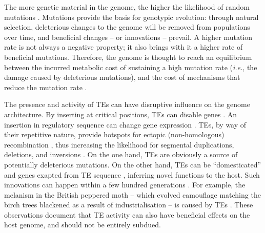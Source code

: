 The more genetic material in the genome, the higher the likelihood of
random mutations \citep{Wielgoss2011}. Mutations provide the basis for
genotypic evolution: through natural selection, deleterious changes to
the genome will be removed from populations over time, and beneficial
changes -- or innovations -- prevail.  A higher mutation rate is not
always a negative property; it also brings with it a higher rate of
beneficial mutations.  Therefore, the genome is thought to reach an
equilibrium between the incurred metabolic cost of sustaining a high
mutation rate (\emph{i.e.}, the damage caused by deleterious mutations),
and the cost of mechanisms that reduce the mutation rate
\citep{Bernstein1987, Altenberg2011}.

The presence and activity of TEs can have disruptive influence on the
genome architecture. By inserting at critical positions, TEs can disable
genes \citep{Kazazian1988}. An insertion in regulatory sequence can
change gene expression \citep{Warnefors2010}. TEs, by way of their
repetitive nature, provide hotspots for ectopic (non-homologous)
recombination \citep{Lim1988, Gray2000, Fiston-Lavier2007}, thus
increasing the likelihood for segmental duplications, deletions, and
inversions \citep{Mathiopoulos1998, Remnant2013}. On the one hand, TEs
are obviously a source of potentially deleterious mutations. On the
other hand, TEs can be ``domesticated'' and genes exapted from TE
sequence \citep{Gahan2001, Daborn2002, Aminetzach2005, Chen2007},
inferring novel functions to the host. Such innovations can happen
within a few hundred generations \citep{Dolgin2006, Struchiner2009,
Kofler2015}. For example, the melanism in the British peppered moth --
which evolved camouflage matching the birch trees blackened as a result
of industrialisation -- is caused by TEs \citep{Hof2016}. These
observations document that TE activity can also have beneficial effects
on the host genome, and should not be entirely subdued.

